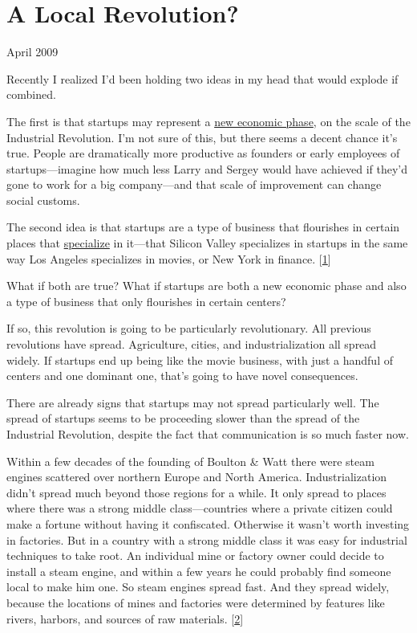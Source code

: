 \chapter{A Local Revolution?}



April 2009

Recently I realized I'd been holding two ideas in my head that would explode if combined.

The first is that startups may represent a \href{http://www.paulgraham.com/highres.html}{new economic phase}, on the scale of the Industrial Revolution. I'm not sure of this, but there seems a decent chance it's true.  People are dramatically more 
productive as founders or early employees of startups---imagine how much less Larry and Sergey would have achieved if they'd gone to work for a big company---and that scale of improvement can change social customs.

The second idea is that startups are a type of business that flourishes in certain places that \href{http://www.paulgraham.com/startuphubs.html}{specialize} in it---that Silicon Valley specializes in startups in the same way Los Angeles specializes in movies, or New York in finance. [\href{\#f1n}{1}]

What if both are true?  What if startups are both a new economic phase and also a type of business that only flourishes in certain centers?

If so, this revolution is going to be particularly revolutionary. All previous revolutions have spread.  Agriculture, cities, and industrialization all spread widely. If startups end up being like the movie business, with just a handful of centers and one dominant one, that's going to have novel consequences.

There are already signs that startups may not spread particularly well.  The spread of startups seems to be proceeding slower than the spread of the Industrial Revolution, despite the fact that communication is so much faster now.

Within a few decades of the founding of Boulton \& Watt there were steam engines scattered over northern Europe and North America.  Industrialization didn't spread much beyond those regions for a while. It only spread to places where there was a strong middle class---countries where a private citizen could make a fortune without having it confiscated. Otherwise it wasn't worth investing in factories.  But in a country with a strong middle class it was easy for industrial techniques to take root.  An individual mine or factory owner could decide to install a steam engine, and within a few years he could probably find someone local to make him one.  So steam engines spread fast.  And they spread widely, because the locations of mines and factories were determined by features like rivers, harbors, and sources of raw materials. 
 [\href{\#f2n}{2}]


